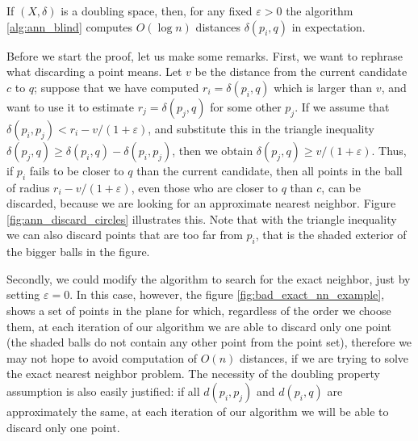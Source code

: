 \documentclass[a4paper,USenglish]{socg-lipics-v2018}
\newcommand{\eps}{\varepsilon}
\newcommand{\dist}{\delta}
\begin{document}
\begin{theorem}
    If $(X, \dist)$ is a doubling space, then, for any fixed $\eps > 0$ the
    algorithm \ref{alg:ann_blind} computes $O(\log n)$ distances $\dist(p_i, q)$ in expectation.
\end{theorem}

Before we start the proof, let us make some remarks. First, we want
to rephrase what discarding a point means. 
Let $v$ be the distance from the current candidate $c$ to $q$;
suppose that we have computed $r_i = \dist(p_i, q)$ which is larger than $v$,
and want to use it to estimate $r_j = \dist(p_j, q)$ for some other $p_j$. If we assume 
that $\dist(p_i, p_j) < r_i - v/(1+\eps)$,
and substitute this in the triangle inequality $\dist(p_j, q) \geq \dist(p_i, q) - \dist(p_i, p_j)$, then we obtain $\dist(p_j, q) \geq v / (1 + \eps)$. Thus, if $p_i$ fails to be closer to $q$ than the current candidate, then all points in the ball of radius $r_i - v / (1 + \eps)$,
even those who are closer to $q$ than $c$, can be discarded, because we are looking for an approximate nearest neighbor. Figure \ref{fig:ann_discard_circles} illustrates this. Note that with the triangle inequality we can also discard points that are too far from $p_i$, that is the shaded exterior of the bigger balls in the figure.


Secondly,
we could modify the algorithm to search for the exact neighbor, just by setting $\eps = 0$. In this case, however, 
the figure \ref{fig:bad_exact_nn_example},
shows a set of points in the plane for which, regardless of the order we choose them,
at each iteration of our algorithm we are able to discard only one point (the shaded balls do not contain any other point from the point set), 
therefore we may not hope to avoid computation of $O(n)$ distances, if we
are trying to solve the exact nearest neighbor problem.
The necessity of the doubling property assumption is also easily justified: if all $d(p_i, p_j)$
and $d(p_i, q)$ are approximately the same, at each iteration of our algorithm we will be able to discard only one point.
\end{document}
